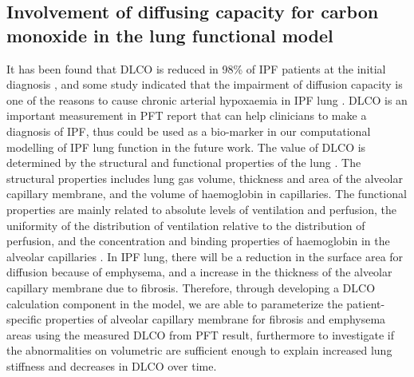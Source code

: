 \subsection{Involvement of diffusing capacity for carbon monoxide in the lung functional model}
It has been found that DLCO is reduced in 98\% of IPF patients at the initial diagnosis \citep{cortes2014idiopathic}, and some study indicated that the impairment of diffusion capacity is one of the reasons to cause chronic arterial hypoxaemia in IPF lung \citep{plantier2018physiology}. DLCO is an important measurement in PFT report that can help clinicians to make a diagnosis of IPF, thus could be used as a bio-marker in our computational modelling of IPF lung function in the future work. The value of DLCO is determined by the structural and functional properties of the lung \citep{graham20172017}. The structural properties includes lung gas volume, thickness and area of the alveolar capillary membrane, and the volume of haemoglobin in capillaries. The functional properties are mainly related to absolute levels of ventilation and perfusion, the uniformity of the distribution of ventilation relative to the distribution of perfusion, and the concentration and binding properties of haemoglobin in the alveolar capillaries \citep{graham20172017}. In IPF lung, there will be a reduction in the surface area for diffusion because of emphysema, and a increase in the thickness of the alveolar capillary membrane due to fibrosis. Therefore, through developing a DLCO calculation component in the model, we are able to parameterize the patient-specific properties of alveolar capillary membrane for fibrosis and emphysema areas using the measured DLCO from PFT result, furthermore to investigate if the abnormalities on volumetric are sufficient enough to explain increased lung stiffness and decreases in DLCO over time.   

